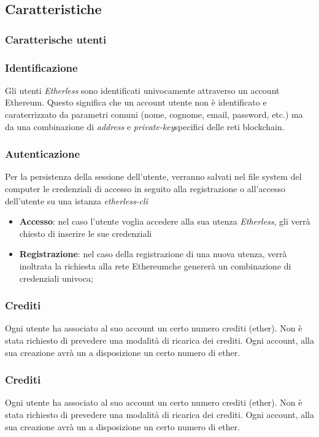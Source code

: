 \subsection{Caratteristiche}
\subsubsection{Caratterische utenti}
\subsubsection{Identificazione}
Gli utenti \textit{Etherless} sono identificati univocamente attraverso un account Ethereum\glo. Questo significa che un account utente non è identificato e caraterrizzato da parametri comuni (nome, cognome, email, password, etc.) ma da una combinazione di \textit{address} e \textit{private-key}\glo specifici delle reti blockchain.
\subsubsection{Autenticazione}
Per la persistenza della sessione dell'utente, verranno salvati nel file system del computer le credenziali di accesso in seguito alla registrazione o all'accesso dell'utente su una istanza \textit{etherless-cli}
\begin{itemize}
	\item \textbf{Accesso}: nel caso l'utente voglia accedere alla sua utenza \textit{Etherless}, gli verrà chiesto di inserire le sue credenziali
	\item \textbf{Registrazione}: nel caso della registrazione di una nuova utenza, verrà inoltrata la richiesta alla rete Ethereum\glo che genererà un combinazione di credenziali univoca;
\end{itemize}
\subsubsection{Crediti}
Ogni utente ha associato al suo account un certo numero crediti (ether\glo). Non è stata richiesto di prevedere una modalità di ricarica dei crediti. Ogni account, alla sua creazione avrà un a disposizione un certo numero di ether\glo.
\subsubsection{Crediti}
Ogni utente ha associato al suo account un certo numero crediti (ether\glo). Non è stata richiesto di prevedere una modalità di ricarica dei crediti. Ogni account, alla sua creazione avrà un a disposizione un certo numero di ether\glo.

